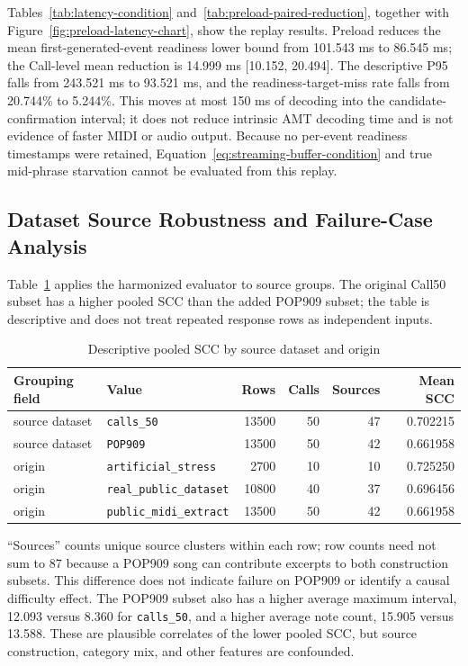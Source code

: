 \documentclass[11pt,a4paper]{article}
\begin{document}
Tables~\ref{tab:latency-condition} and~\ref{tab:preload-paired-reduction}, together with Figure~\ref{fig:preload-latency-chart}, show the replay results. Preload reduces the mean first-generated-event readiness lower bound from 101.543 ms to 86.545 ms; the Call-level mean reduction is 14.999 ms [10.152, 20.494]. The descriptive P95 falls from 243.521 ms to 93.521 ms, and the readiness-target-miss rate falls from 20.744\% to 5.244\%. This moves at most 150 ms of decoding into the candidate-confirmation interval; it does not reduce intrinsic AMT decoding time and is not evidence of faster MIDI or audio output. Because no per-event readiness timestamps were retained, Equation~\eqref{eq:streaming-buffer-condition} and true mid-phrase starvation cannot be evaluated from this replay.

\subsection{Dataset Source Robustness and Failure-Case Analysis}
\label{subsec:robustness-failure}

Table~\ref{tab:source-origin-summary} applies the harmonized evaluator to source groups. The original Call50 subset has a higher pooled SCC than the added POP909 subset; the table is descriptive and does not treat repeated response rows as independent inputs.

\begin{table}[htbp]
\centering
\caption{Descriptive pooled SCC by source dataset and origin}
\label{tab:source-origin-summary}
\small
\begin{tabular}{llrrrr}
\toprule
Grouping field & Value & Rows & Calls & Sources & Mean SCC \\
\midrule
source dataset & \texttt{calls\_50} & 13500 & 50 & 47 & 0.702215 \\
source dataset & \texttt{POP909} & 13500 & 50 & 42 & 0.661958 \\
\midrule
origin & \texttt{artificial\_stress} & 2700 & 10 & 10 & 0.725250 \\
origin & \texttt{real\_public\_dataset} & 10800 & 40 & 37 & 0.696456 \\
origin & \texttt{public\_midi\_extract} & 13500 & 50 & 42 & 0.661958 \\
\bottomrule
\end{tabular}
\end{table}

``Sources'' counts unique source clusters within each row; row counts need not sum to 87 because a POP909 song can contribute excerpts to both construction subsets. This difference does not indicate failure on POP909 or identify a causal difficulty effect. The POP909 subset also has a higher average maximum interval, 12.093 versus 8.360 for \texttt{calls\_50}, and a higher average note count, 15.905 versus 13.588. These are plausible correlates of the lower pooled SCC, but source construction, category mix, and other features are confounded.
\end{document}
